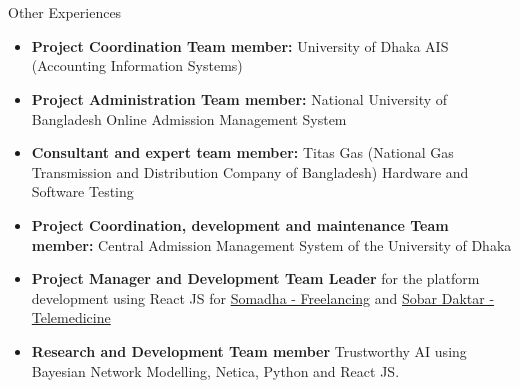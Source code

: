 \section{\faBuilding}{Other Experiences}
\begin{itemize}[noitemsep]
    \item \textbf{Project Coordination Team member:} University of Dhaka AIS (Accounting Information Systems)
    \item \textbf{Project Administration Team member:} National University of Bangladesh Online Admission Management System
    \item \textbf{Consultant and expert team member:} Titas Gas (National Gas Transmission and Distribution Company of Bangladesh) Hardware and Software Testing
    \item \textbf{Project Coordination, development and maintenance Team member:} Central Admission Management System of the University of Dhaka
    \item \textbf{Project Manager and Development Team Leader} for the platform development using React JS for \href{https://www.somadha.com}{Somadha - Freelancing}  and \href{https://sobar-daktar.somadha.com}{Sobar Daktar - Telemedicine}
    \item \textbf{Research and Development Team member} Trustworthy AI using Bayesian Network Modelling, Netica, Python and React JS.
\end{itemize}
